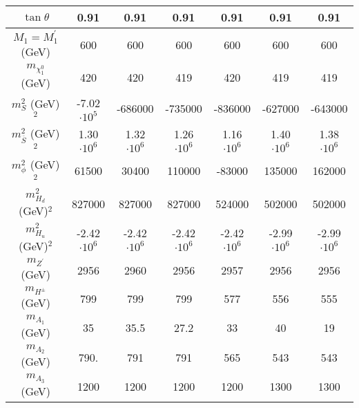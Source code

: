 \documentclass[12pt,a4paper]{article}
\begin{document}
\begin{table}
\begin{tabular}{| c || c | c |c| c| c| c |}
$\tan\theta$                     &      0.91                &  0.91        & 	0.91             &   0.91           & 	0.91             & 	0.91   \\   
\hline
$M_1 = M_1^\prime$ (GeV) 	         &     600                  &   600         & 	600              &   600           & 	600    	 & 	600            \\
$m_{\chi_1^0}$ (GeV)                &    420                   & 	420         & 	419               &   420          &    419         & 	419            \\   
\hline
$m_S^2$ (GeV)$^2$                     &    -7.02$\cdot 10^5$             & 	-686000     & 	-735000           &  -836000        & 	-627000     & 	-643000        \\   
$m_{\overline{S}}^2$ (GeV)$^2$            &    1.30$\cdot 10^6$             &   1.32$\cdot 10^6$    & 	1.26 $\cdot 10^6$          &  1.16$\cdot 10^6$        &  1.40 $\cdot 10^6$    & 	1.38$\cdot 10^6$       \\
$m_\phi^2$ (GeV)$^2$                   &     61500                &  30400        & 	110000            & -83000           & 	135000    & 	162000         \\   
$m_{H_d}^2$ (GeV)$^2$                  &   827000                 & 	827000       & 	827000             &  524000         & 	502000    & 	502000         \\   
$m_{H_u}^2$ (GeV)$^2$                  &   -2.42$\cdot 10^6$            & 	-2.42$\cdot 10^6$    & 	-2.42$\cdot 10^6$          & -2.42$\cdot 10^6$       & 	-2.99$\cdot 10^6$         & 	-2.99$\cdot 10^6$ \\ 
\hline
$m_{Z^\prime}$ (GeV)                 &  	2956                & 	2960         & 	2956               & 2957            & 2956         & 	2956          \\   
$m_{H^\pm}$ (GeV)                   &    	799                  & 	799          & 	799                & 577             & 556         & 	555           \\   
$m_{A_1}$ (GeV)                    &	35                & 	35.5        & 	27.2               & 33              & 	40                & 	19    \\  
$m_{A_2}$ (GeV)                    &	790.                 & 	791         & 	791                &  565            & 	543               & 	543   \\   
$m_{A_3}$ (GeV)                    &     1200               & 	1200         & 	1200               & 1200             & 1300              & 	1300   \\   

\end{tabular}
\end{table}
\end{document}
